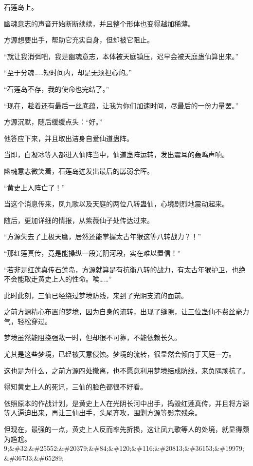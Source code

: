 
\begin{this_body}

石莲岛上。

幽魂意志的声音开始断断续续，并且整个形体也变得越加稀薄。

方源想要出手，帮助它充实自身，但却被它阻止。

“就让我消弭吧，我是幽魂意志，本体被天庭镇压，迟早会被天庭蛊仙算出来。”

“至于分魂……短时间内，却是无须担心的。”

“石莲岛不存，我的使命也完结了。”

“现在，趁着还有最后一丝底蕴，让我为你们加速时间，尽最后的一份力量罢。”

方源沉默，随后缓缓点头：“好。”

他答应下来，并且取出洁身自爱仙道蛊阵。

当即，白凝冰等人都进入仙阵当中，仙道蛊阵运转，发出震耳的轰鸣声响。

幽魂意志微笑着，石莲岛迸发出最后的孱弱余晖。

“黄史上人阵亡了！”

当这个消息传来，凤九歌以及天庭的两位八转蛊仙，心境剧烈地震动起来。

随后，更加详细的情报，从紫薇仙子处传达过来。

“方源失去了上极天鹰，居然还能掌握太古年猴这等八转战力？！”

“那红莲真传，竟是能操纵一段光阴河段，实在难以置信！”

“若非是红莲真传石莲岛，方源就算是有抗衡八转的战力，有太古年猴护卫，也绝不会能取走黄史上人的性命。唉……”

此时此刻，三仙已经绕过梦境防线，来到了光阴支流的面前。

之前方源精心布置的梦境，因为自身的流转，出现了缝隙，让三位蛊仙不费丝毫力气，轻松穿过。

梦境虽然能阻挠强敌一时，但却很不可靠，不能依赖长久。

尤其是这些梦境，已经被天意侵蚀。梦境的流转，很显然会倾向于天庭一方。

这也是为什么，之前方源四处撤离，也不愿意利用梦境结成防线，来负隅顽抗了。

得知黄史上人的死讯，三仙的脸色都很不好看。

依照原本的作战计划，是黄史上人在光阴长河中出手，捣毁红莲真传，并且将方源等人逼迫出来，再让三仙出手，头尾齐攻，围剿方源等影宗残余。

但现在，最强的一点，黄史上人反而率先折损，这让凤九歌等人的处境，就显得颇为尴尬。9;\&\#32;\&\#25552;\&\#20379;\&\#84;\&\#120;\&\#116;\&\#20813;\&\#36153;\&\#19979;\&\#36733;\&\#65289;


\end{this_body}

